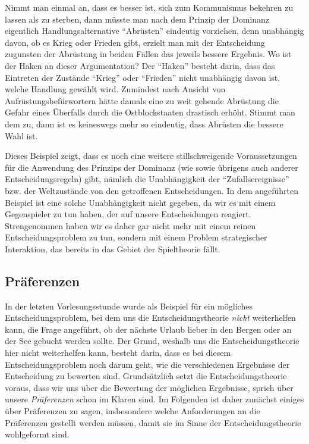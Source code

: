 Nimmt man einmal an, dass es besser ist, sich zum Kommunismus bekehren zu lassen
als zu sterben, dann müsste man nach dem Prinzip der Dominanz eigentlich
Handlungsalternative "`Abrüsten"' eindeutig vorziehen, denn unabhängig davon, ob
es Krieg oder Frieden gibt, erzielt man mit der Entscheidung zugunsten der
Abrüstung in beiden Fällen das jeweils bessere Ergebnis. Wo ist der Haken an
dieser Argumentation? Der "`Haken"' besteht darin, dass das Eintreten der
Zustände "`Krieg"' oder "`Frieden"' nicht unabhängig davon ist, welche Handlung
gewählt wird. Zumindest nach Ansicht von
Aufrüstungsbefürwortern hätte damals eine zu weit gehende Abrüstung die Gefahr
eines Überfalls durch die Ostblockstaaten drastisch erhöht. Stimmt man dem zu,
dann ist es keineswegs mehr so eindeutig, dass Abrüsten die bessere Wahl ist.

Dieses Beispiel zeigt, dass es noch eine weitere stillschweigende Voraussetzungen
für die Anwendung des Prinzips der Dominanz (wie sowie übrigens auch anderer
Entscheidungsregeln) gibt, nämlich die Unabhängigkeit der "`Zufallsereignisse"'
bzw. der Weltzustände von den getroffenen Entscheidungen. In dem angeführten
Beispiel ist eine solche Unabhängigkeit nicht gegeben, da wir es mit einem
Gegenspieler zu tun haben, der auf unsere Entscheidungen reagiert. Strengenommen
haben wir es daher gar nicht mehr mit einem reinen Entscheidungsproblem zu tun,
sondern mit einem Problem strategischer Interaktion, das bereits in das Gebiet
der Spieltheorie fällt.

\subsection{Präferenzen}
\label{Praeferenzen}
In der letzten Vorlesungsstunde wurde als Beispiel für ein mögliches
Entscheidungsproblem, bei dem uns die Entscheidungstheorie {\em nicht}
weiterhelfen kann, die Frage angeführt, ob der nächste Urlaub lieber in den
Bergen oder an der See gebucht werden sollte. Der Grund, weshalb uns die
Entscheidungstheorie hier nicht weiterhelfen kann, besteht darin, dass es bei
diesem Entscheidungsproblem noch darum geht, wie die verschiedenen Ergebnisse
der Entscheidung zu bewerten sind. Grundsätzlich setzt die Entscheidungstheorie
voraus, dass wir uns über die Bewertung der möglichen Ergebnisse, sprich über
unsere {\em Präferenzen} schon im Klaren sind. Im Folgenden ist daher zunächst
einiges über Präferenzen zu sagen, insbesondere welche Anforderungen an die
Präferenzen gestellt werden müssen, damit sie im Sinne der Entscheidungstheorie
wohlgeformt sind. 


